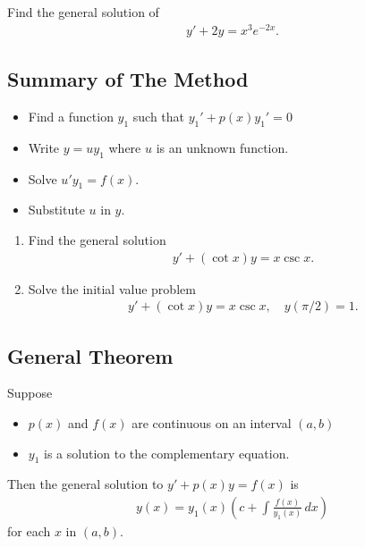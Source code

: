 \documentclass[12pt,a4paper]{article}
\newcounter{example}[section]
\begin{document}
	\vspace*{16pt}
	
	\begin{example}
	Find the general solution of
		\begin{align*}
		y' + 2y = x^3 e^{-2x} .
		\end{align*}
	\end{example}
	
\newpage

\subsection{Summary of The Method}

	\begin{itemize}
	\item Find a function $y_1$ such that $y_1' + p(x) y_1' = 0$
	\item Write $y = u y_1$ where $u$ is an unknown function.
	\item Solve $u' y_1 = f(x)$.
	\item Substitute $u$ in $y$.
	\end{itemize}
	
\vspace*{16pt}

\begin{example}
\begin{enumerate}
\item Find the general solution
	\begin{align*}
	y' + (\cot x) y = x \csc x .
	\end{align*}
\item Solve the initial value problem
	\begin{align*}
	y' + (\cot x) y = x \csc x , \quad y(\pi/2 ) = 1 .
	\end{align*}
\end{enumerate}
\end{example}

\newpage

\phantom{2}

\newpage

\subsection{General Theorem}
Suppose
	\begin{itemize}
	\item $p(x)$ and $f(x)$ are continuous on an interval $(a, b)$ 	\item $y_1$ is a solution to the complementary equation.
	\end{itemize}
Then the general solution to $y' + p(x) y = f(x)$ is
	\begin{align*}
	y (x) = y_1 (x) \left( c + \int \frac{f(x)}{y_1 (x)} \, dx \right) 
	\end{align*}
for each $x$ in $(a, b)$.
	
\end{document}
